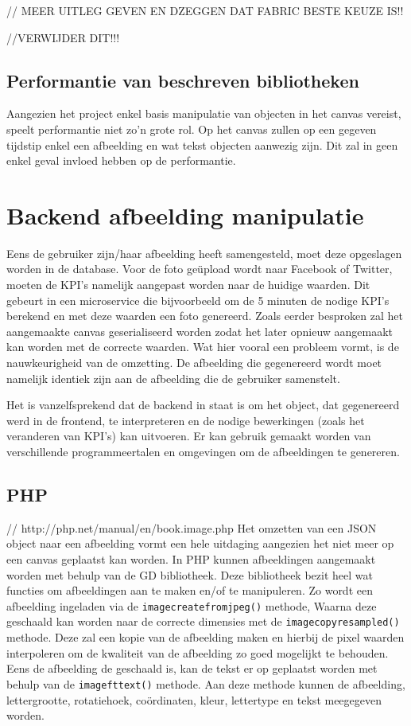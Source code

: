 	
// MEER UITLEG GEVEN EN DZEGGEN DAT FABRIC BESTE KEUZE IS!!

//VERWIJDER DIT!!!

\subsection{Performantie van beschreven bibliotheken}
Aangezien het project enkel basis manipulatie van objecten in het canvas vereist, speelt performantie niet zo'n grote rol. Op het canvas zullen op een gegeven tijdstip enkel een afbeelding en wat tekst objecten aanwezig zijn. Dit zal in geen enkel geval invloed hebben op de performantie. 




\newpage
\section{Backend afbeelding manipulatie}
Eens de gebruiker zijn/haar afbeelding heeft samengesteld, moet deze opgeslagen worden in de database. Voor de foto ge\"{u}pload wordt naar Facebook of Twitter, moeten de KPI's namelijk aangepast worden naar de huidige waarden. Dit gebeurt in een microservice die bijvoorbeeld om de 5 minuten de nodige KPI's berekend en met deze waarden een foto genereerd. Zoals eerder besproken zal het aangemaakte canvas geserialiseerd worden zodat het later opnieuw aangemaakt kan worden met de correcte waarden. Wat hier vooral een probleem vormt, is de nauwkeurigheid van de omzetting. De afbeelding die gegenereerd wordt moet namelijk identiek zijn aan de afbeelding die de gebruiker samenstelt. 

Het is vanzelfsprekend dat de backend in staat is om het object, dat gegenereerd werd in de frontend, te interpreteren en de nodige bewerkingen (zoals het veranderen van KPI's) kan uitvoeren. Er kan gebruik gemaakt worden van verschillende programmeertalen en omgevingen om de afbeeldingen te genereren. 

\subsection{PHP} // http://php.net/manual/en/book.image.php
Het omzetten van een JSON object naar een afbeelding vormt een hele uitdaging aangezien het niet meer op een canvas geplaatst kan worden. In PHP kunnen afbeeldingen aangemaakt worden met behulp van de GD bibliotheek. Deze bibliotheek bezit heel wat functies om afbeeldingen aan te maken en/of te manipuleren. Zo wordt een afbeelding ingeladen via de \lstinline{imagecreatefromjpeg()} methode, Waarna deze geschaald kan worden naar de correcte dimensies met de \lstinline{imagecopyresampled()} methode. Deze zal een kopie van de afbeelding maken en hierbij de pixel waarden interpoleren om de kwaliteit van de afbeelding zo goed mogelijkt te behouden. Eens de afbeelding de geschaald is, kan de tekst er op geplaatst worden met behulp van de \lstinline{imagefttext()} methode. Aan deze methode kunnen de afbeelding, lettergrootte, rotatiehoek, co\"{o}rdinaten, kleur, lettertype en tekst meegegeven worden. 

